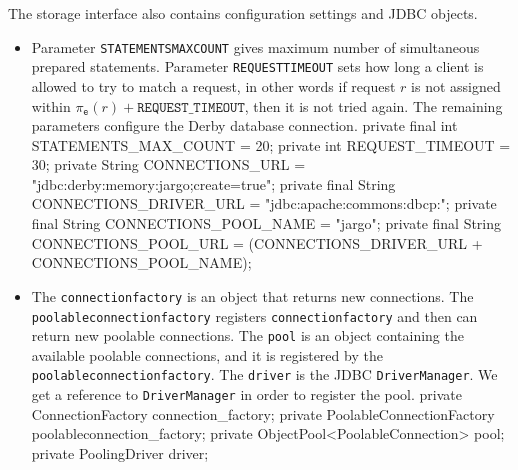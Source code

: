 The storage interface also contains configuration settings and JDBC objects.
\begin{itemize}
\item Parameter
{\tt{}STATEMENTS{}MAX{}COUNT} gives maximum number of simultaneous prepared
statements. Parameter {\tt{}REQUEST{}TIMEOUT} sets how long a client is allowed to
try to match a request, in other words if request $r$ is not assigned within
$\pi_\texttt{e}(r)+\texttt{REQUEST\_TIMEOUT}$, then it is not tried again.
The remaining parameters configure the Derby database connection.
\nwenddocs{}\plusendmoddef
private final int    STATEMENTS_MAX_COUNT   = 20;
private       int    REQUEST_TIMEOUT        = 30;
private       String CONNECTIONS_URL        = "jdbc:derby:memory:jargo;create=true";
private final String CONNECTIONS_DRIVER_URL = "jdbc:apache:commons:dbcp:";
private final String CONNECTIONS_POOL_NAME  = "jargo";
private final String CONNECTIONS_POOL_URL   = (CONNECTIONS_DRIVER_URL + CONNECTIONS_POOL_NAME);
\nwendcode{}\nwdocspar
\item The {\tt{}connection{}factory} is an object that returns new connections. The
{\tt{}poolableconnection{}factory} registers {\tt{}connection{}factory} and then can
return new poolable connections.  The {\tt{}pool} is an object containing the
available poolable connections, and it is registered by the
{\tt{}poolableconnection{}factory}. The {\tt{}driver} is the JDBC {\tt{}DriverManager}.
We get a reference to {\tt{}DriverManager} in order to register the pool.
\nwenddocs{}\plusendmoddef
private ConnectionFactory               connection_factory;
private PoolableConnectionFactory       poolableconnection_factory;
private ObjectPool<PoolableConnection>  pool;
private PoolingDriver                   driver;
\nwendcode{}\nwdocspar
\end{itemize}

